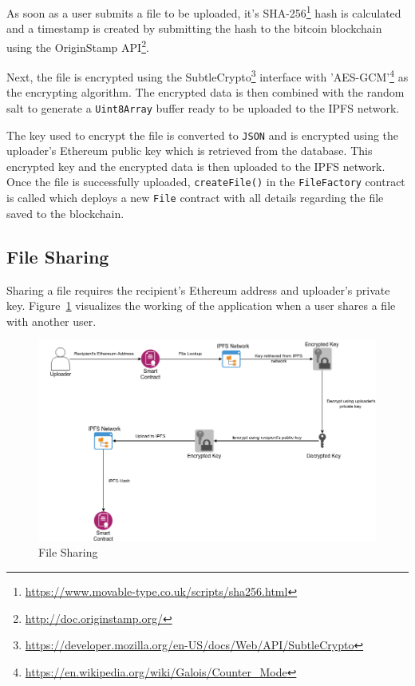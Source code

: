 As soon as a user submits a file to be uploaded, it's SHA-256\footnote{\url{https://www.movable-type.co.uk/scripts/sha256.html}} hash is calculated and a timestamp is created by submitting the hash to the bitcoin blockchain using the OriginStamp API\footnote{\url{http://doc.originstamp.org/}}.

Next, the file is encrypted using the SubtleCrypto\footnote{\url{https://developer.mozilla.org/en-US/docs/Web/API/SubtleCrypto}} interface with 'AES-GCM'\footnote{\url{https://en.wikipedia.org/wiki/Galois/Counter_Mode}} as the encrypting algorithm. The encrypted data is then combined with the random salt to generate a \texttt{Uint8Array} buffer ready to be uploaded to the IPFS network.

The key used to encrypt the file is converted to \texttt{JSON} and is encrypted using the uploader's Ethereum public key which is retrieved from the database. This encrypted key and the encrypted data is then uploaded to the IPFS network. Once the file is successfully uploaded, \texttt{createFile()} in the \texttt{FileFactory} contract is called which deploys a new \texttt{File} contract with all details regarding the file saved to the blockchain.

\subsection{File Sharing}
Sharing a file requires the recipient's Ethereum address and uploader's private key. Figure~\ref{fig:ethereum-share} visualizes the working of the application when a user shares a file with another user.

\begin{figure}[h]
	\includegraphics[width=\linewidth]{figures/ethereum-share}
	\caption{\label{fig:ethereum-share} File Sharing}
\end{figure}

